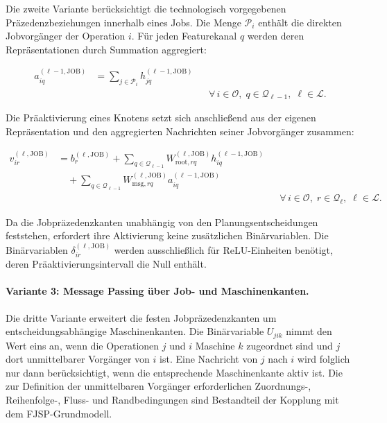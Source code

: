 Die zweite Variante berücksichtigt die technologisch vorgegebenen
Präzedenzbeziehungen innerhalb eines Jobs. Die Menge $\mathcal{P}_i$ enthält
die direkten Jobvorgänger der Operation $i$. Für jeden Featurekanal $q$
werden deren Repräsentationen durch Summation aggregiert:

\begin{align}
a_{iq}^{(\ell-1,\mathrm{JOB})}
&=
\sum_{j\in\mathcal{P}_i}
h_{jq}^{(\ell-1,\mathrm{JOB})}
\nonumber\\
&&&
\forall\,i\in\mathcal{O},\;
q\in\mathcal{Q}_{\ell-1},\;
\ell\in\mathcal{L}.
\label{eq:gnn-job-aggregation}
\end{align}

Die Präaktivierung eines Knotens setzt sich anschließend aus der eigenen
Repräsentation und den aggregierten Nachrichten seiner Jobvorgänger zusammen:

\begin{align}
v_{ir}^{(\ell,\mathrm{JOB})}
&=
b_r^{(\ell,\mathrm{JOB})}
+
\sum_{q\in\mathcal{Q}_{\ell-1}}
W_{\mathrm{root},rq}^{(\ell,\mathrm{JOB})}
h_{iq}^{(\ell-1,\mathrm{JOB})}
\nonumber\\
&\quad+
\sum_{q\in\mathcal{Q}_{\ell-1}}
W_{\mathrm{msg},rq}^{(\ell,\mathrm{JOB})}
a_{iq}^{(\ell-1,\mathrm{JOB})}
\nonumber\\
&&&
\forall\,i\in\mathcal{O},\;
r\in\mathcal{Q}_\ell,\;
\ell\in\mathcal{L}.
\label{eq:gnn-job-layer}
\end{align}

Da die Jobpräzedenzkanten unabhängig von den Planungsentscheidungen
feststehen, erfordert ihre Aktivierung keine zusätzlichen Binärvariablen. Die
Binärvariablen $\delta_{ir}^{(\ell,\mathrm{JOB})}$ werden ausschließlich für
ReLU-Einheiten benötigt, deren Präaktivierungsintervall die Null enthält.



\paragraph{Variante 3: Message Passing über Job- und Maschinenkanten.}

Die dritte Variante erweitert die festen Jobpräzedenzkanten um
entscheidungsabhängige Maschinenkanten. Die Binärvariable $U_{jik}$ nimmt den
Wert eins an, wenn die Operationen $j$ und $i$ Maschine $k$ zugeordnet sind
und $j$ dort unmittelbarer Vorgänger von $i$ ist. Eine Nachricht von $j$ nach
$i$ wird folglich nur dann berücksichtigt, wenn die entsprechende
Maschinenkante aktiv ist. Die zur Definition der unmittelbaren Vorgänger
erforderlichen Zuordnungs-, Reihenfolge-, Fluss- und Randbedingungen sind
Bestandteil der Kopplung mit dem FJSP-Grundmodell.

